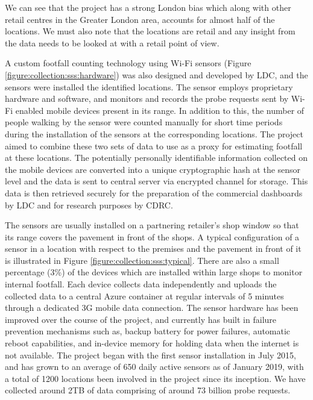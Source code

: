 We can see that the project has a strong London bias which along with other retail centres in the Greater London area, accounts for almost half of the locations.
We must also note that the locations are retail and any insight from the data needs to be looked at with a retail point of view.

A custom footfall counting technology using Wi-Fi sensors (Figure \ref{figure:collection:sss:hardware}) was also designed and developed by LDC, and the sensors were installed the identified locations.
The sensor employs proprietary hardware and software, and monitors and records the probe requests sent by Wi-Fi enabled mobile devices present in its range.
In addition to this, the number of people walking by the sensor were counted manually for short time periods during the installation of the sensors at the corresponding locations.
The project aimed to combine these two sets of data to use as a proxy for estimating footfall at these locations.
The potentially personally identifiable information collected on the mobile devices are converted into a unique cryptographic hash at the sensor level and the data is sent to central server via encrypted channel for storage.
This data is then retrieved securely for the preparation of the commercial dashboards by LDC and for research purposes by CDRC.

The sensors are usually installed on a partnering retailer's shop window so that its range covers the pavement in front of the shops.
A typical configuration of a sensor in a location with respect to the premises and the pavement in front of it is illustrated in Figure \ref{figure:collection:sss:typical}.
There are also a small percentage (3\%) of the devices which are installed within large shops to monitor internal footfall.
Each device collects data independently and uploads the collected data to a central Azure container at regular intervals of 5 minutes through a dedicated 3G mobile data connection.
The sensor hardware has been improved over the course of the project, and currently has built in failure prevention mechanisms such as, backup battery for power failures, automatic reboot capabilities, and in-device memory for holding data when the internet is not available.
The project began with the first sensor installation in July 2015, and has grown to an average of 650 daily active sensors as of January 2019, with a total of 1200 locations been involved in the project since its inception.
We have collected around 2TB of data comprising of around 73 billion probe requests.

